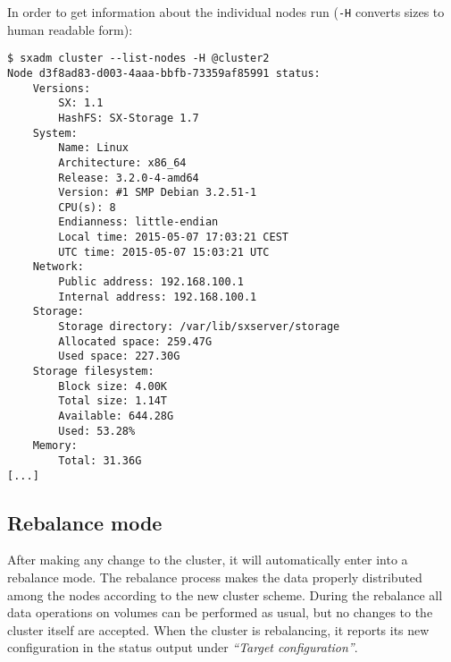 In order to get information about the individual nodes run (\verb+-H+ converts
sizes to human readable form):
\begin{lstlisting}
$ sxadm cluster --list-nodes -H @cluster2
Node d3f8ad83-d003-4aaa-bbfb-73359af85991 status:
    Versions:
        SX: 1.1
        HashFS: SX-Storage 1.7
    System:
        Name: Linux
        Architecture: x86_64
        Release: 3.2.0-4-amd64
        Version: #1 SMP Debian 3.2.51-1
        CPU(s): 8
        Endianness: little-endian
        Local time: 2015-05-07 17:03:21 CEST
        UTC time: 2015-05-07 15:03:21 UTC
    Network:
        Public address: 192.168.100.1
        Internal address: 192.168.100.1
    Storage:
        Storage directory: /var/lib/sxserver/storage
        Allocated space: 259.47G
        Used space: 227.30G
    Storage filesystem:
        Block size: 4.00K
        Total size: 1.14T
        Available: 644.28G
        Used: 53.28%
    Memory:
        Total: 31.36G
[...]
\end{lstlisting}


\subsection{Rebalance mode}
After making any change to the cluster, it will automatically enter into
a rebalance mode. The rebalance process makes the data properly distributed
among the nodes according to the new cluster scheme. During the rebalance
all data operations on volumes can be performed as usual, but no changes
to the cluster itself are accepted. When the cluster is rebalancing, it
reports its new configuration in the status output under
\emph{``Target configuration''}.

